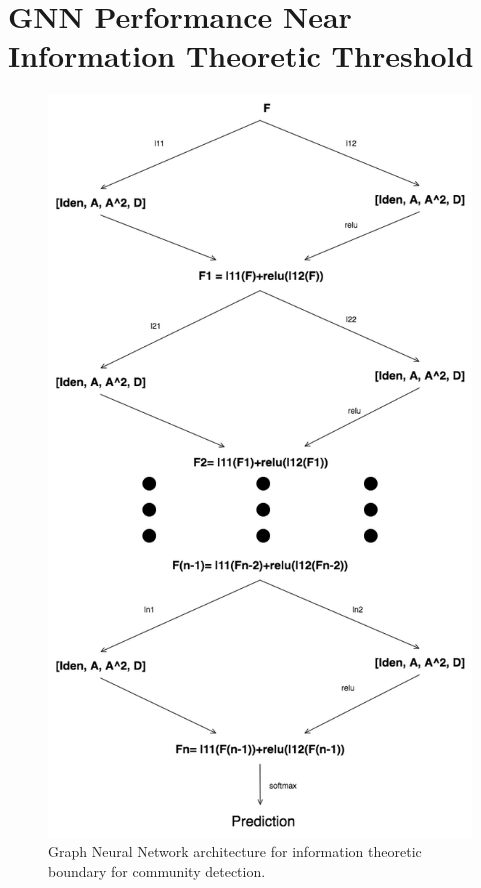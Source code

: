 \section{GNN Performance Near Information Theoretic Threshold}
\begin{figure}[H]
\begin{center}
  \includegraphics[scale=0.47]{GNN_SBM.png}
  \caption{Graph Neural Network architecture for information theoretic boundary for community detection.}
  \label{fig:GNN}
\end{center}
\end{figure}

